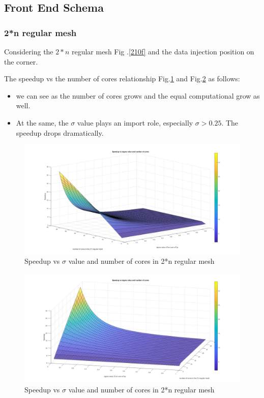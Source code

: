 \subsection{Front End Schema}

\subsubsection{2*n regular mesh}
Considering the $2*n $ regular mesh Fig .\ref{210f} and the data injection position on the corner.

The speedup vs the number of cores relationship Fig.\ref{corner2n} and Fig.\ref{corner2n2} as follows:

\vspace*{15pt}
\begin{itemize}
\item we can see as the number of cores grows and the equal computational grow as well. 
\item At the same, the $\sigma$ value plays an import role, especially $\sigma > 0.25$. The speedup drops dramatically.
\end{itemize}


\begin{figure}[h]
\centering\includegraphics[width=0.85\linewidth]{figure/corner2n}
\caption{Speedup vs $\sigma$ value and number of cores in 2*n regular mesh}
\label{corner2n}
\end{figure}
\vspace*{30pt}

\begin{figure}[h]
\centering\includegraphics[width=0.85\linewidth]{figure/corner2n2}
\caption{Speedup vs $\sigma$ value and number of cores in 2*n regular mesh}
\label{corner2n2}
\end{figure}



